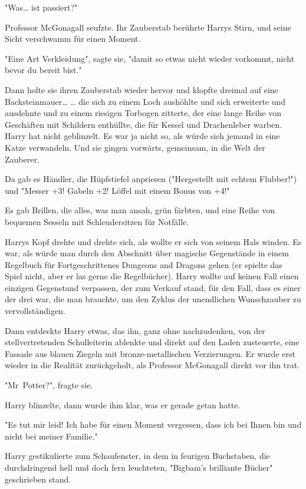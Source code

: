 {"Was… ist passiert?"

Professor McGonagall seufzte. Ihr Zauberstab berührte Harrys Stirn, und seine Sicht verschwamm für einen Moment.

"Eine Art Verkleidung", sagte sie, "damit so etwas nicht wieder vorkommt, nicht bevor du bereit bist."

Dann holte sie ihren Zauberstab wieder hervor und klopfte dreimal auf eine Backsteinmauer… … die sich zu einem Loch aushöhlte und sich erweiterte und ausdehnte und zu einem riesigen Torbogen zitterte, der eine lange Reihe von Geschäften mit Schildern enthüllte, die für Kessel und Drachenleber warben. Harry hat nicht geblinzelt. Es war ja nicht so, als würde sich jemand in eine Katze verwandeln. Und sie gingen vorwärts, gemeinsam, in die Welt der Zauberer.

Da gab es Händler, die Hüpfstiefel anpriesen ("Hergestellt mit echtem Flubber!") und "Messer +3! Gabeln +2! Löffel mit einem Bonus von +4!"

Es gab Brillen, die alles, was man ansah, grün färbten, und eine Reihe von bequemen Sesseln mit Schleudersitzen für Notfälle.

Harrys Kopf drehte und drehte sich, als wollte er sich von seinem Hals winden. Es war, als würde man durch den Abschnitt über magische Gegenstände in einem Regelbuch für Fortgeschrittenes Dungeons and Dragons gehen (er spielte das Spiel nicht, aber er las gerne die Regelbücher). Harry wollte auf keinen Fall einen einzigen Gegenstand verpassen, der zum Verkauf stand, für den Fall, dass es einer der drei war, die man brauchte, um den Zyklus der unendlichen Wunschzauber zu vervollständigen.

Dann entdeckte Harry etwas, das ihn, ganz ohne nachzudenken, von der stellvertretenden Schulleiterin ablenkte und direkt auf den Laden zusteuerte, eine Fassade aus blauen Ziegeln mit bronze-metallischen Verzierungen. Er wurde erst wieder in die Realität zurückgeholt, als Professor McGonagall direkt vor ihn trat.

"Mr~Potter?", fragte sie.

Harry blinzelte, dann wurde ihm klar, was er gerade getan hatte.

"Es tut mir leid! Ich habe für einen Moment vergessen, dass ich bei Ihnen bin und nicht bei meiner Familie."

Harry gestikulierte zum Schaufenster, in dem in feurigen Buchstaben, die durchdringend hell und doch fern leuchteten, "Bigbam's brilliante Bücher" geschrieben stand.

}
